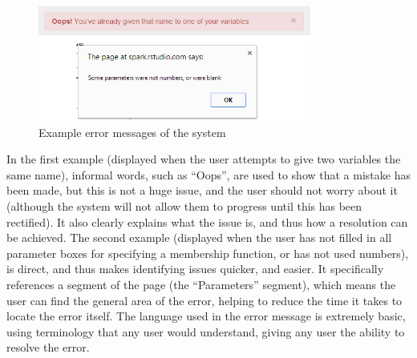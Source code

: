 \newpage 
\begin{figure}[ht!]
	\vspace{-1mm}
	\begin{center}
			\includegraphics[width=0.8\textwidth]{images/ss-ui-11}
	\end{center}
	\vspace{-6mm}
	\captionsetup{justification=centering,margin=2cm}
	\caption{Example error messages of the system}
	\label{fig:ss-ui-11}
\end{figure}
\noindent 
In the first example (displayed when the user attempts to give two variables the same name), informal words, such as ``Oops'', are used to show that a mistake has been made, but this is not a huge issue, and the user should not worry about it (although the system will not allow them to progress until this has been rectified). It also clearly explains what the issue is, and thus how a resolution can be achieved. The second example (displayed when the user has not filled in all parameter boxes for specifying a membership function, or has not used numbers), is direct, and thus makes identifying issues quicker, and easier. It specifically references a segment of the page (the ``Parameters'' segment), which means the user can find the general area of the error, helping to reduce the time it takes to locate the error itself. The language used in the error message is extremely basic, using terminology that any user would understand, giving any user the ability to resolve the error.

